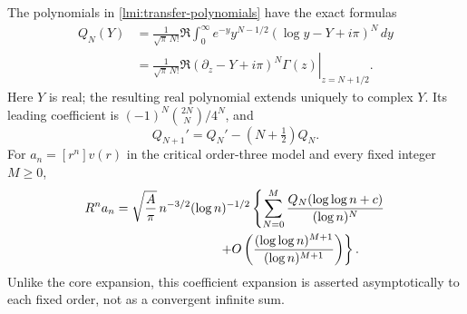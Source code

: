 \begin{theorem}
\label{lmi:moments}
The polynomials in \eqref{lmi:transfer-polynomials} have the exact formulas
\begin{align}
 Q_N(Y)
 &=\frac1{\sqrt\pi\,N!}\Re\int_0^\infty
       e^{-y}y^{N-1/2}(\log y-Y+i\pi)^N\,dy \label{lmi:moment}\\
 &=\left.\frac1{\sqrt\pi\,N!}
       \Re(\partial_z-Y+i\pi)^N\Gamma(z)\right|_{z=N+1/2}.
       \label{lmi:gamma}
\end{align}
Here $Y$ is real; the resulting real polynomial extends uniquely to
complex $Y$. Its leading coefficient is
$(-1)^N\binom{2N}{N}/4^N$, and
\begin{equation}\label{lmi:derivative-recurrence}
 Q_{N+1}'=Q_N'-(N+\tfrac12)Q_N.
\end{equation}
For $a_n=[r^n]v(r)$ in the critical order-three model and every fixed
integer $M\ge0$,
\begin{equation}\label{lmi:coefficient-law}
\begin{split}
 R^na_n={}&\sqrt{\frac A\pi}\,n^{-3/2}(\log n)^{-1/2}
 \left\{\sum_{N=0}^M
 \frac{Q_N(\log\log n+c)}{(\log n)^N}\right.\\
 &\left.\hspace{24mm}
 +O\left(\frac{(\log\log n)^{M+1}}{(\log n)^{M+1}}\right)\right\}.
\end{split}
\end{equation}
Unlike the core expansion, this coefficient expansion is asserted
asymptotically to each fixed order, not as a convergent infinite sum.
\end{theorem}
